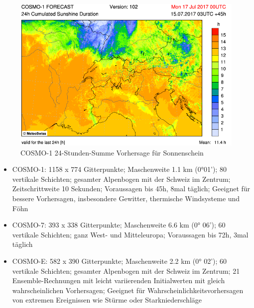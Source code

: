 \begin{refsection}
\begin{figure}
\centering
\includegraphics[width=\hsize]{klima/cosmo1.png}
\caption{COSMO-1 24-Stunden-Summe Vorhersage für Sonnenschein \cite{klima:meteoschweiz}
\label{klima:wettervorhersagen:cosmo}}
\end{figure}

\begin{itemize}
\item COSMO-1: 1158 x 774 Gitterpunkte; Maschenweite 1.1 km (0°01'); 80 vertikale Schichten; gesamter Alpenbogen mit der Schweiz im Zentrum; Zeitschrittweite 10 Sekunden; Voraussagen bis 45h, 8mal täglich; Geeignet für bessere Vorhersagen, insbesondere Gewitter, thermische Windsysteme und Föhn \cite{klima:meteoschweiz}
\item COSMO-7: 393 x 338 Gitterpunkte; Maschenweite 6.6 km (0° 06'); 60 vertikale Schichten; ganz West- und Mitteleuropa; Voraussagen bis 72h, 3mal täglich \cite{klima:meteoschweiz} 
\item COSMO-E: 582 x 390 Gitterpunkte; Maschenweite 2.2 km (0° 02'); 60 vertikale Schichten; gesamter Alpenbogen mit der Schweiz im Zentrum; 21 Ensemble-Rechnungen mit leicht variierenden Initialwerten mit gleich wahrscheinlichen Vorhersagen; Geeignet für Wahrscheinlichkeitsvorhersagen von extremen Ereignissen wie Stürme oder Starkniederschläge \cite{klima:meteoschweiz} 
\end{itemize}



\end{refsection}
